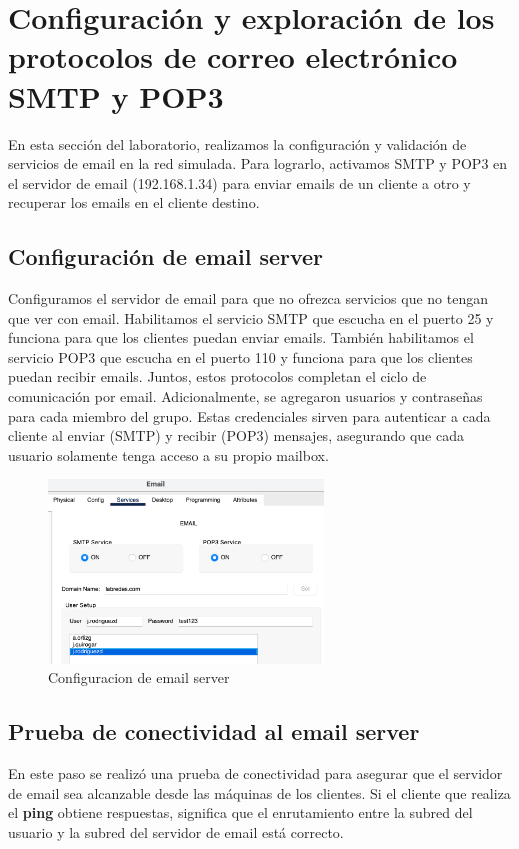 \documentclass[10pt]{article}
\begin{document}
\section{Configuración y exploración de los protocolos de correo electrónico SMTP y POP3}
En esta sección del laboratorio, realizamos la configuración y validación de servicios de email en la red simulada. Para lograrlo, activamos SMTP y POP3 en el servidor de email (192.168.1.34) para enviar emails de un cliente a otro y recuperar los emails en el cliente destino.
\subsection{Configuración de email server}
Configuramos el servidor de email para que no ofrezca servicios que no tengan que ver con email. Habilitamos el servicio SMTP que escucha en el puerto 25 y funciona para que los clientes puedan enviar emails. También habilitamos el servicio POP3 que escucha en el puerto 110 y funciona para que los clientes puedan recibir emails. Juntos, estos protocolos completan el ciclo de comunicación por email. Adicionalmente, se agregaron usuarios y contraseñas para cada miembro del grupo. Estas credenciales sirven para autenticar a cada cliente al enviar (SMTP) y recibir (POP3) mensajes, asegurando que cada usuario solamente tenga acceso a su propio mailbox.


\begin{figure}[H]
    \centering
    \includegraphics[width=0.65\textwidth]{lab-01-screenshots/45-1-email-config.png}
    \caption{Configuracion de email server}
\end{figure}


\subsection{Prueba de conectividad al email server}
En este paso se realizó una prueba de conectividad para asegurar que el servidor de email sea alcanzable desde las máquinas de los clientes. Si el cliente que realiza el \textbf{ping} obtiene respuestas, significa que el enrutamiento entre la subred del usuario y la subred del servidor de email está correcto.
\end{document}
